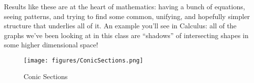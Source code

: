 \begin{remark}

Results like these are at the heart of mathematics: having a bunch of
equations, seeing patterns, and trying to find some common, unifying,
and hopefully simpler structure that underlies all of it. An example
you'll see in Calculus: all of the graphs we've been looking at in this
class are ``shadows'' of intersecting shapes in some higher dimensional
space!

\begin{figure}
\centering
\texttt{[image: figures/ConicSections.png]}
\caption{Conic Sections}
\end{figure}

\end{remark}

\cleardoublepage

\renewcommand{\listtheoremname}{}
\listoftheorems[ignoreall,show={definition}, numwidth=3.5em]
\cleardoublepage

\renewcommand{\listtheoremname}{}
\listoftheorems[ignoreall,show={theorem,proposition}, numwidth=3.5em]
\cleardoublepage

\renewcommand{\listtheoremname}{}
\listoftheorems[ignoreall,show={exercise}, numwidth=3.5em]
\cleardoublepage

\listoffigures
\cleardoublepage


\printbibliography[title=Bibliography]



